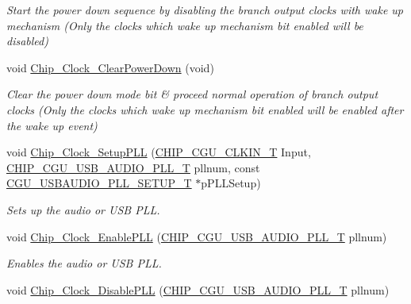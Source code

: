 \begin{DoxyCompactItemize}
\begin{DoxyCompactList}\small\item\em Start the power down sequence by disabling the branch output clocks with wake up mechanism (Only the clocks which wake up mechanism bit enabled will be disabled) \end{DoxyCompactList}\item 
void \hyperlink{group___c_l_o_c_k__18_x_x__43_x_x_ga28a09f033418df7c8588b073af5d6eac}{Chip\+\_\+\+Clock\+\_\+\+Clear\+Power\+Down} (void)
\begin{DoxyCompactList}\small\item\em Clear the power down mode bit \& proceed normal operation of branch output clocks (Only the clocks which wake up mechanism bit enabled will be enabled after the wake up event) \end{DoxyCompactList}\item 
void \hyperlink{group___c_l_o_c_k__18_x_x__43_x_x_gaed16ed3df8281cb642db7525fdf1493d}{Chip\+\_\+\+Clock\+\_\+\+Setup\+P\+LL} (\hyperlink{group___c_l_o_c_k__18_x_x__43_x_x_ga0975326707efebf2b074283e6c602f18}{C\+H\+I\+P\+\_\+\+C\+G\+U\+\_\+\+C\+L\+K\+I\+N\+\_\+T} Input, \hyperlink{group___c_l_o_c_k__18_x_x__43_x_x_ga839a458a9e1e2a85e68470156c861e6a}{C\+H\+I\+P\+\_\+\+C\+G\+U\+\_\+\+U\+S\+B\+\_\+\+A\+U\+D\+I\+O\+\_\+\+P\+L\+L\+\_\+T} pllnum, const \hyperlink{struct_c_g_u___u_s_b_a_u_d_i_o___p_l_l___s_e_t_u_p___t}{C\+G\+U\+\_\+\+U\+S\+B\+A\+U\+D\+I\+O\+\_\+\+P\+L\+L\+\_\+\+S\+E\+T\+U\+P\+\_\+T} $\ast$p\+P\+L\+L\+Setup)
\begin{DoxyCompactList}\small\item\em Sets up the audio or U\+SB P\+LL. \end{DoxyCompactList}\item 
void \hyperlink{group___c_l_o_c_k__18_x_x__43_x_x_ga2715e421f23a820691b719126ebed2e0}{Chip\+\_\+\+Clock\+\_\+\+Enable\+P\+LL} (\hyperlink{group___c_l_o_c_k__18_x_x__43_x_x_ga839a458a9e1e2a85e68470156c861e6a}{C\+H\+I\+P\+\_\+\+C\+G\+U\+\_\+\+U\+S\+B\+\_\+\+A\+U\+D\+I\+O\+\_\+\+P\+L\+L\+\_\+T} pllnum)
\begin{DoxyCompactList}\small\item\em Enables the audio or U\+SB P\+LL. \end{DoxyCompactList}\item 
void \hyperlink{group___c_l_o_c_k__18_x_x__43_x_x_gaa9ce1d7461c0eeca2fe5b72528d9d81e}{Chip\+\_\+\+Clock\+\_\+\+Disable\+P\+LL} (\hyperlink{group___c_l_o_c_k__18_x_x__43_x_x_ga839a458a9e1e2a85e68470156c861e6a}{C\+H\+I\+P\+\_\+\+C\+G\+U\+\_\+\+U\+S\+B\+\_\+\+A\+U\+D\+I\+O\+\_\+\+P\+L\+L\+\_\+T} pllnum)

\end{DoxyCompactItemize}
